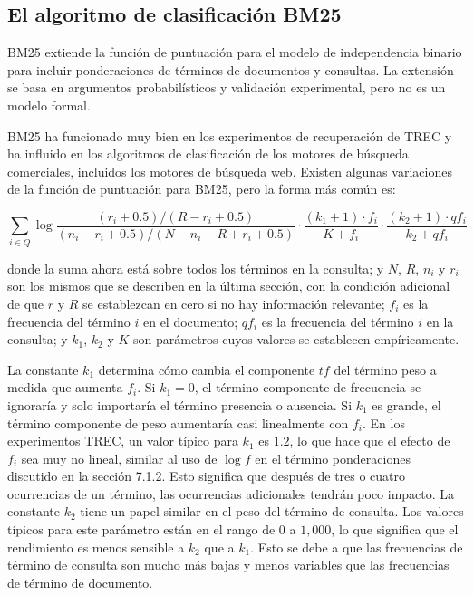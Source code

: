 \subsection{El algoritmo de clasificación BM25}

BM25 extiende la función de puntuación para el modelo de independencia binario para incluir ponderaciones de términos de documentos y consultas. La extensión se basa en argumentos probabilísticos y validación experimental, pero no es un modelo formal.

BM25 ha funcionado muy bien en los experimentos de recuperación de TREC y ha influido en los algoritmos de clasificación de los motores de búsqueda comerciales, incluidos los motores de búsqueda web. Existen algunas variaciones de la función de puntuación para BM25, pero la forma más común es:

$$\sum_{i\in Q}\log{\frac{(r_i+0.5)/(R-r_i+0.5)}{(n_i-r_i+0.5)/(N-n_i-R+r_i+0.5)}}\cdot \frac{(k_1+1)\cdot f_i}{K+f_i}\cdot \frac{(k_2+1)\cdot qf_i}{k_2+qf_i}$$

donde la suma ahora está sobre todos los términos en la consulta; y $N$, $R$, $n_i$ y $r_i$ son los mismos que se describen en la última sección, con la condición adicional de que $r$ y $R$ se establezcan en cero si no hay información relevante; $f_i$ es la frecuencia del término $i$ en el documento; $qf_i$ es la frecuencia del término $i$ en la consulta; y $k_1$, $k_2$ y $K$ son parámetros cuyos valores se establecen empíricamente.

La constante $k_1$ determina cómo cambia el componente $tf$ del término peso a medida que aumenta $f_i$. Si $k_1 = 0$, el término componente de frecuencia se ignoraría y solo importaría el término presencia o ausencia. Si $k_1$ es grande, el término componente de peso aumentaría casi linealmente con $f_i$. En los experimentos TREC, un valor típico para $k_1$ es $1.2$, lo que hace que el efecto de $f_i$ sea muy no lineal, similar al uso de $\log{f}$ en el término ponderaciones discutido en la sección 7.1.2. Esto significa que después de tres o cuatro ocurrencias de un término, las ocurrencias adicionales tendrán poco impacto. La constante $k_2$ tiene un papel similar en el peso del término de consulta. Los valores típicos para este parámetro están en el rango de $0$ a $1,000$, lo que significa que el rendimiento es menos sensible a $k_2$ que a $k_1$. Esto se debe a que las frecuencias de término de consulta son mucho más bajas y menos variables que las frecuencias de término de documento.

